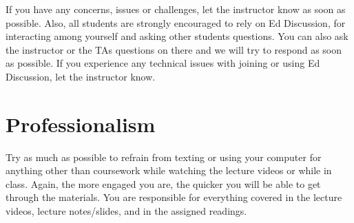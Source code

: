 \documentclass[11pt, a4paper]{article}
\begin{document}
If you have any concerns, issues or challenges, let the instructor know as soon as possible. Also, all students are strongly encouraged to rely on Ed Discussion, for interacting among yourself and asking other students questions. You can also ask the instructor or the TAs questions on there and we will try to respond as soon as possible.  If you experience any technical issues with joining or using Ed Discussion, let the instructor know.


\section{Professionalism}
Try as much as possible to refrain from texting or using your computer for anything other than coursework while watching the lecture videos or while in class. Again, the more engaged you are, the quicker you will be able to get through the materials. You are responsible for everything covered in the lecture videos, lecture notes/slides, and in the assigned readings.
\end{document}
